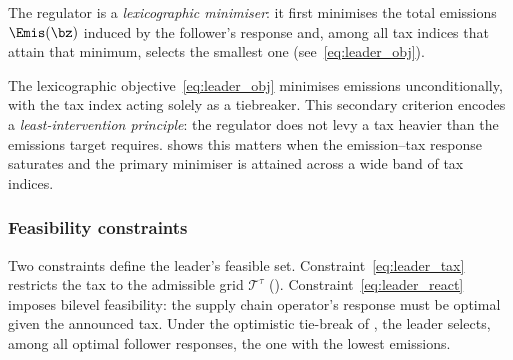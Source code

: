 The regulator is a \emph{lexicographic minimiser}: it first minimises
the total emissions $\Emis(\bz)$ induced by the follower's response and,
among all tax indices that attain that minimum, selects the smallest one
(see~\eqref{eq:leader_obj}).

\begin{remark}\label{rem:lexicographic}
The lexicographic objective~\eqref{eq:leader_obj} minimises emissions
unconditionally, with the tax index acting solely as a tiebreaker. This
secondary criterion encodes a \emph{least-intervention principle}: the
regulator does not levy a tax heavier than the emissions target
requires.  shows this matters when the
emission--tax response saturates and the primary minimiser is attained
across a wide band of tax indices.
\end{remark}

\subsubsection{Feasibility constraints}
\label{sec:model:leader_constr}

Two constraints define the leader's feasible set. Constraint~\eqref{eq:leader_tax}
restricts the tax to the admissible grid $\mathcal{T}^{\tau}$
(). Constraint~\eqref{eq:leader_react}
imposes bilevel feasibility: the supply chain operator's response must
be optimal given the announced tax. Under the optimistic
tie-break of , the leader selects, among all optimal
follower responses, the one with the lowest emissions.
